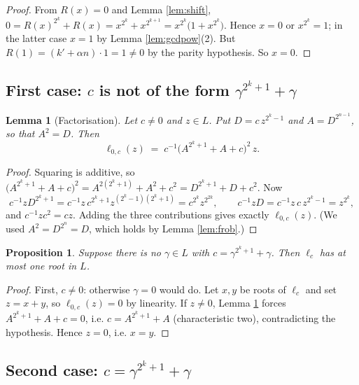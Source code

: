\documentclass[11pt,a4paper]{article}
\newtheorem{proposition}[theorem]{Proposition}
\newtheorem{lemma}[theorem]{Lemma}
\theoremstyle{definition}
\newcommand{\rhs}{R}
\begin{document}
\begin{proof}
From $\rhs(x)=0$ and Lemma \ref{lem:shift},
$0=\rhs(x)^{2^{k}}+\rhs(x)=x^{2^{k}}+x^{2^{k+1}}=x^{2^{k}}\bigl(1+x^{2^{k}}\bigr)$.
Hence $x=0$ or $x^{2^{k}}=1$; in the latter case $x=1$ by Lemma
\ref{lem:gcdpow}(2).  But $\rhs(1)=(k'+\alpha n)\cdot1=1\neq0$ by the parity
hypothesis.  So $x=0$.
\end{proof}

\subsection{First case: $c$ is not of the form $\gamma^{2^{k}+1}+\gamma$}

\begin{lemma}[Factorisation]\label{lem:factorization}
Let $c\neq0$ and $z\in L$.  Put $D=c\,z^{2^{k}-1}$ and $A=D^{2^{n-1}}$, so that
$A^{2}=D$.  Then
\[
  \ell_{0,c}(z)\;=\;c^{-1}\bigl(A^{2^{k}+1}+A+c\bigr)^{2}\,z .
\]
\end{lemma}

\begin{proof}
Squaring is additive, so
$\bigl(A^{2^{k}+1}+A+c\bigr)^{2}=A^{2(2^{k}+1)}+A^{2}+c^{2}
 =D^{2^{k}+1}+D+c^{2}$.  Now
\[
  c^{-1}zD^{2^{k}+1}=c^{-1}z\,c^{2^{k}+1}z^{(2^{k}-1)(2^{k}+1)}
   =c^{2^{k}}z^{2^{2k}},\qquad
  c^{-1}zD=c^{-1}z\,c\,z^{2^{k}-1}=z^{2^{k}},
\]
and $c^{-1}zc^{2}=cz$.  Adding the three contributions gives exactly
$\ell_{0,c}(z)$.  (We used $A^{2}=D^{2^{n}}=D$, which holds by Lemma
\ref{lem:frob}.)
\end{proof}

\begin{proposition}\label{prop:case1}
Suppose there is \emph{no} $\gamma\in L$ with $c=\gamma^{2^{k}+1}+\gamma$.  Then
$\ell_c$ has at most one root in $L$.
\end{proposition}

\begin{proof}
First, $c\neq0$: otherwise $\gamma=0$ would do.  Let $x,y$ be roots of $\ell_c$
and set $z=x+y$, so $\ell_{0,c}(z)=0$ by linearity.  If $z\neq0$, Lemma
\ref{lem:factorization} forces $A^{2^{k}+1}+A+c=0$, i.e.
$c=A^{2^{k}+1}+A$ (characteristic two), contradicting the hypothesis.  Hence
$z=0$, i.e. $x=y$.
\end{proof}

\subsection{Second case: $c=\gamma^{2^{k}+1}+\gamma$}
\end{document}
